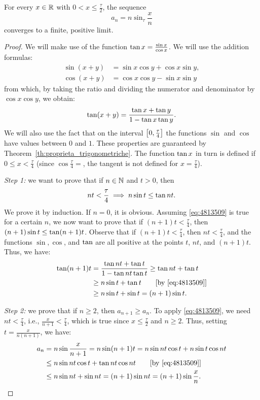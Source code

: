\begin{theorem}
\label{teo_limite_pi}
For every $x\in {\mathbb R}$ with $0<x \le \frac \tau 2$, the sequence
\[
    a_n = n \sin_\tau \frac x n
\]
converges to a finite, positive limit.
\end{theorem}
%
\begin{proof}
We will make use of the function $\operatorname{tan} x= \frac{\sin x}{\cos x}$. We will use the
addition formulas:
\begin{align*}
 \sin(x+y) &= \sin x\cos y + \cos x \sin y,\\
 \cos(x+y) &= \cos x \cos y - \sin x \sin y  
\end{align*}
from which, by taking the ratio and dividing the numerator and denominator by
$\cos x \cos y$, we obtain:
\[
  \operatorname{tan}(x+y) = \frac{\operatorname{tan} x + \operatorname{tan} y}{1-\operatorname{tan} x \operatorname{tan} y}.
\]
We will also use the fact that on the interval $\left[0,\frac \tau 4\right]$
 the functions $\sin$ and $\cos$ have values between $0$ and
$1$. These properties are guaranteed by
Theorem~\ref{th:proprieta_trigonometriche}. The function $\operatorname{tan} x$ in turn is
defined if $0\le x < \frac \tau 4$ (since $\cos \frac \tau 4=$, the tangent is
not defined for $x=\frac \tau 4$).

\emph{Step 1:} we want to prove that if $n\in {\mathbb N}$ and $t>0$, then
\begin{equation}\label{eq:4813509}
  nt <\frac \tau 4
  \implies
  n\sin t\le \operatorname{tan} nt.
\end{equation}
We prove it by induction. If $n=0$, it is obvious. Assuming \eqref{eq:4813509}
is true for a certain $n$, we now want to prove that if $(n+1)t < \frac \tau 4$,
then $(n+1)\sin t \le \operatorname{tan} (n+1)t$. Observe that if $(n+1)t<\frac \tau 4$, then
$nt < \frac \tau 4$, and the functions $\sin,\cos$, and $\operatorname{tan}$ are all positive
at the points $t$, $nt$, and $(n+1)t$. Thus, we have:
\begin{align*}
\operatorname{tan} (n+1) t 
  &= \frac{\operatorname{tan} nt + \operatorname{tan} t}{1-\operatorname{tan} nt \operatorname{tan} t}
  \ge \operatorname{tan} nt + \operatorname{tan} t \\
  &\ge n\sin t + \operatorname{tan} t \qquad\text{[by \eqref{eq:4813509}]}\\
  &\ge n\sin t + \sin t
  =(n+1)\sin t. 
\end{align*}

\emph{Step 2:} we prove that if $n\ge 2$, then $a_{n+1} \ge a_n$. To apply \eqref{eq:4813509}, we need $nt < \frac \tau 4$, i.e., $\frac x {n+1}< \frac \tau 4$, which is true since $x\le \frac {\tau} 2$ and $n\ge 2$. Thus, setting $t = \frac{x}{n(n+1)}$, we have:
\begin{align*}
  a_n &= n \sin\frac{x}{n+1} 
    = n \sin (n+1)t
    = n \sin nt \cos t + n \sin t \cos nt\\
    &\le n \sin nt \cos t + \operatorname{tan} nt \cos nt
    \qquad\text{[by \eqref{eq:4813509}]}\\
    &\le n \sin nt + \sin nt
    = (n+1) \sin nt = (n+1) \sin \frac x n.
\end{align*}


\end{proof}

